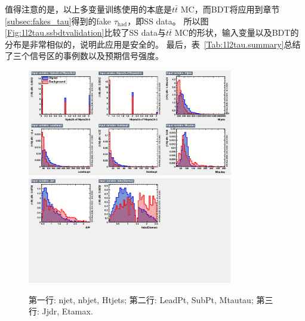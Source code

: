 值得注意的是，以上多变量训练使用的本底是$t\bar{t}$ MC，而BDT将应用到章节\ref{subsec:fakes_tau}得到的fake $\tau_{\text{had}}$，即SS data。
所以图\ref{Fig:1l2tau.ssbdtvalidation}比较了SS data与$t\bar{t}$ MC的形状，输入变量以及BDT的分布是非常相似的，说明此应用是安全的。
最后，表~\ref{Tab:1l2tau.summary}总结了三个信号区的事例数以及预期信号强度。
\begin{figure}[htbp]
\centering
\begin{center}
  \includegraphics[width=0.8\textwidth, keepaspectratio]{fig/OneLepTwoTaus/variables_id_c1.pdf}
  \includegraphics[width=0.8\textwidth, keepaspectratio]{fig/OneLepTwoTaus/variables_id_c2.pdf}
\end{center}
\caption{第一行: njet, nbjet, Htjets; 第二行: LeadPt, SubPt, Mtautau; 第三行: Jjdr, Etamax.}
\label{Fig:1l2tau.bdtinputs}
\end{figure}


